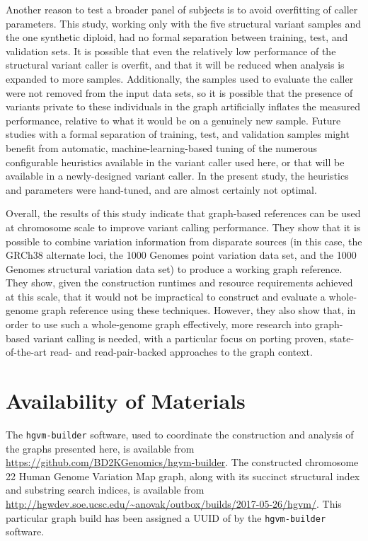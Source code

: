 Another reason to test a broader panel of subjects is to avoid overfitting of caller parameters. This study, working only with the five structural variant samples and the one synthetic diploid, had no formal separation between training, test, and validation sets. It is possible that even the relatively low performance of the structural variant caller is overfit, and that it will be reduced when analysis is expanded to more samples. Additionally, the samples used to evaluate the caller were not removed from the input data sets, so it is possible that the presence of variants private to these individuals in the graph artificially inflates the measured performance, relative to what it would be on a genuinely new sample. Future studies with a formal separation of training, test, and validation samples might benefit from automatic, machine-learning-based tuning of the numerous configurable heuristics available in the variant caller used here, or that will be available in a newly-designed variant caller. In the present study, the heuristics and parameters were hand-tuned, and are almost certainly not optimal.

Overall, the results of this study indicate that graph-based references can be used at chromosome scale to improve variant calling performance. They show that it is possible to combine variation information from disparate sources (in this case, the GRCh38 alternate loci, the 1000 Genomes point variation data set, and the 1000 Genomes structural variation data set) to produce a working graph reference. They show, given the construction runtimes and resource requirements achieved at this scale, that it would not be impractical to construct and evaluate a whole-genome graph reference using these techniques. However, they also show that, in order to use such a whole-genome graph effectively, more research into graph-based variant calling is needed, with a particular focus on porting proven, state-of-the-art read- and read-pair-backed approaches to the graph context.


\section{Availability of Materials}

\begin{sloppypar}
The \texttt{hgvm-builder} software, used to coordinate the construction and analysis of the graphs presented here, is available from \url{https://github.com/BD2KGenomics/hgvm-builder}. The constructed chromosome 22 Human Genome Variation Map graph, along with its succinct structural index and substring search indices, is available from \url{http://hgwdev.soe.ucsc.edu/~anovak/outbox/builds/2017-05-26/hgvm/}. This particular graph build has been assigned a UUID of  by the \texttt{hgvm-builder} software.
\end{sloppypar}

